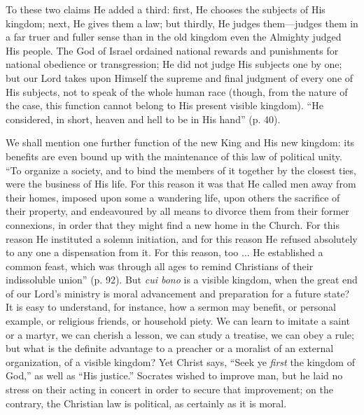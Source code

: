 To these two claims He added a third: first, He
chooses the subjects of His kingdom; next, He gives them a law; but
thirdly, He judges them—judges them in a far truer and fuller sense
than in the old kingdom even the Almighty judged His people. The God
of Israel ordained national rewards and punishments for national
obedience or transgression; He did not judge His subjects one by one;
but our Lord takes upon Himself the supreme and final judgment of
every one of His subjects, not to speak of the whole human race
(though, from the nature of the case, this function cannot belong to
His present visible kingdom). ``He considered, in short, heaven and
hell to be in His hand'' (p. 40).

We shall mention one further function of the new
King and His new kingdom: its benefits are even bound up with the
maintenance of this law of political unity. ``To organize a society,
and to bind the members of it together by the closest ties, were the
business of His life. For this reason it was that He called men away
from their homes, imposed upon some a wandering life, upon others the
sacrifice of their property, and endeavoured by all means to divorce
them from their former connexions, in order that they might find a new
home in the Church. For this reason He instituted a solemn initiation,
and for this reason He refused absolutely to any one a dispensation
from it. For this reason, too ... He established a common feast, which
was through all ages to remind Christians of their indissoluble union''
(p. 92). But \emph{cui bono} is a visible kingdom, when the great end
of our Lord's ministry is moral advancement and preparation for
a future state? It is easy to understand, for instance, how a sermon
may benefit, or personal example, or religious friends, or household
piety. We can learn to imitate a saint or a martyr, we can cherish a
lesson, we can study a treatise, we can obey a rule; but what is the
definite advantage to a preacher or a moralist of an external
organization, of a visible kingdom? Yet Christ says, ``Seek ye \emph{first}
the kingdom of God,'' as well as ``His justice.'' Socrates wished to
improve man, but he laid no stress on their acting in concert in order
to secure that improvement; on the contrary, the Christian law is
political, as certainly as it is moral.

